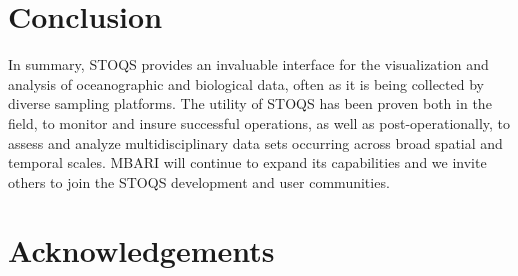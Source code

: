 \documentclass[conference]{IEEEtran}
\begin{document}
%





\section{Conclusion}
In summary, STOQS provides an invaluable interface for the visualization and analysis of oceanographic and biological data, often as it is being collected by diverse sampling platforms.  The utility of STOQS has been proven both in the field, to monitor and insure successful operations, as well as post-operationally, to assess and analyze multidisciplinary data sets occurring across broad spatial and temporal scales. MBARI will continue to expand its capabilities and we invite others to join the STOQS development and user communities.






\section*{Acknowledgements}
\end{document}
